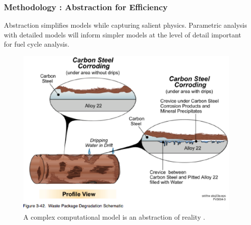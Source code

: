 \begin{frame}[ctb!]
  \frametitle{Methodology : Abstraction for Efficiency}

  \begin{minipage}{0.49\textwidth}
      Abstraction simplifies models while capturing salient physics. 
      Parametric analysis with detailed models will inform simpler models at the 
      level of detail important for fuel cycle analysis.
    \begin{figure}[h!]
        \includegraphics[width=\textwidth]{./images/reality.eps}
      \caption{A complex computational model is an abstraction of reality 
      \cite{doe_viability_1998}.}
      \label{fig:reality}
    \end{figure}
  \end{minipage}
  \hspace{0.01cm}
  \begin{minipage}{0.49\textwidth}
    \begin{figure}[h!]

\end{figure}
\end{minipage}
\end{frame}
